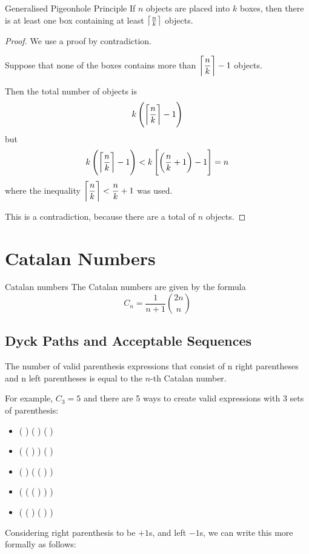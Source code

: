 \begin{thrm}{Generalised Pigeonhole Principle}{} 
If $n$ objects are placed into $k$ boxes, then there is at least one box containing at least $\left\lceil \frac{n}{k} \right\rceil$ objects. 
\end{thrm}

\begin{proof}
We use a proof by contradiction.

Suppose that none of the boxes contains more than $\left\lceil \dfrac{n}{k} \right\rceil - 1$ objects.

Then the total number of objects is \[k\left(\left\lceil \frac{n}{k} \right\rceil-1\right)\] but \[ k\left(\left\lceil \frac{n}{k} \right\rceil - 1\right) < k \left[\left(\frac{n}{k} + 1\right) - 1\right] = n \]
where the inequality $\left\lceil \dfrac{n}{k} \right\rceil < \dfrac{n}{k}+1$ was used.

This is a contradiction, because there are a total of $n$ objects.
\end{proof}
\pagebreak

\section{Catalan Numbers}
\begin{thrm}{Catalan numbers}{}
The Catalan numbers are given by the formula
\begin{equation}
C_n = \frac{1}{n+1} \binom{2n}{n}
\end{equation}
\end{thrm}

\subsection{Dyck Paths and Acceptable Sequences}
The number of valid parenthesis expressions that consist of n right parentheses and n left parentheses is equal to the $n$-th Catalan number. 

For example, $C_3 = 5$ and there are 5 ways to create valid expressions with 3 sets of parenthesis:
\begin{itemize}
    \item ( ) ( ) ( )
    \item ( ( ) ) ( )
    \item ( ) ( ( ) )
    \item ( ( ( ) ) )
    \item ( ( ) ( ) )
\end{itemize}

Considering right parenthesis to be $+1$s, and left $-1$s, we can write this more formally as follows:

